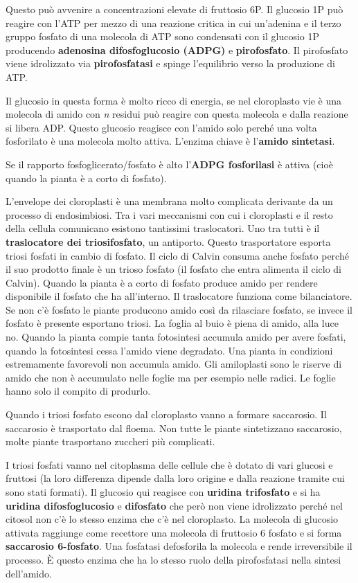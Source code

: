 \documentclass[]{article}
\begin{document}
Questo può avvenire a concentrazioni elevate di fruttosio 6P. Il
glucosio 1P può reagire con l'ATP per mezzo di una reazione critica in
cui un'adenina e il terzo gruppo fosfato di una molecola di ATP sono
condensati con il glucosio 1P producendo \textbf{adenosina
difosfoglucosio (ADPG)} e \textbf{pirofosfato}. Il pirofosfato viene
idrolizzato via \textbf{pirofosfatasi} e spinge l'equilibrio verso la
produzione di ATP.

Il glucosio in questa forma è molto ricco di energia, se nel cloroplasto
vie è una molecola di amido con \emph{n} residui può reagire con questa
molecola e dalla reazione si libera ADP. Questo glucosio reagisce con
l'amido solo perché una volta fosforilato è una molecola molto attiva.
L'enzima chiave è l'\textbf{amido sintetasi}.

Se il rapporto fosfoglicerato/fosfato è alto l'\textbf{ADPG fosforilasi}
è attiva (cioè quando la pianta è a corto di fosfato).

L'envelope dei cloroplasti è una membrana molto complicata derivante da
un processo di endosimbiosi. Tra i vari meccanismi con cui i cloroplasti
e il resto della cellula comunicano esistono tantissimi traslocatori.
Uno tra tutti è il \textbf{traslocatore dei triosifosfato}, un
antiporto. Questo trasportatore esporta triosi fosfati in cambio di
fosfato. Il ciclo di Calvin consuma anche fosfato perché il suo prodotto
finale è un trioso fosfato (il fosfato che entra alimenta il ciclo di
Calvin). Quando la pianta è a corto di fosfato produce amido per rendere
disponibile il fosfato che ha all'interno. Il traslocatore funziona come
bilanciatore. Se non c'è fosfato le piante producono amido così da
rilasciare fosfato, se invece il fosfato è presente esportano triosi. La
foglia al buio è piena di amido, alla luce no. Quando la pianta compie
tanta fotosintesi accumula amido per avere fosfati, quando la
fotosintesi cessa l'amido viene degradato. Una pianta in condizioni
estremamente favorevoli non accumula amido. Gli amiloplasti sono le
riserve di amido che non è accumulato nelle foglie ma per esempio nelle
radici. Le foglie hanno solo il compito di produrlo.

Quando i triosi fosfato escono dal cloroplasto vanno a formare
saccarosio. Il saccarosio è trasportato dal floema. Non tutte le piante
sintetizzano saccarosio, molte piante trasportano zuccheri più
complicati.

I triosi fosfati vanno nel citoplasma delle cellule che è dotato di vari
glucosi e fruttosi (la loro differenza dipende dalla loro origine e
dalla reazione tramite cui sono stati formati). Il glucosio qui reagisce
con \textbf{uridina trifosfato} e si ha \textbf{uridina difosfoglucosio}
e \textbf{difosfato} che però non viene idrolizzato perché nel citosol
non c'è lo stesso enzima che c'è nel cloroplasto. La molecola di
glucosio attivata raggiunge come recettore una molecola di fruttosio 6
fosfato e si forma \textbf{saccarosio 6-fosfato}. Una fosfatasi
defosforila la molecola e rende irreversibile il processo. È questo
enzima che ha lo stesso ruolo della pirofosfatasi nella sintesi
dell'amido.
\end{document}

